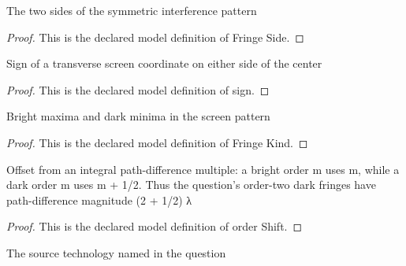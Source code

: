 \begin{definition}
  \label{def:physics:phyx-mini-0248:phyxminiproblems-problemphyxmini0248-fringeside}
  The two sides of the symmetric interference pattern
\end{definition}
\begin{proof}
  This is the declared model definition of Fringe Side.
\end{proof}
\begin{definition}[sign]
  \label{def:physics:phyx-mini-0248:phyxminiproblems-problemphyxmini0248-fringeside-sign}
  Sign of a transverse screen coordinate on either side of the center
\end{definition}
\begin{proof}
  This is the declared model definition of sign.
\end{proof}
\begin{definition}
  \label{def:physics:phyx-mini-0248:phyxminiproblems-problemphyxmini0248-fringekind}
  Bright maxima and dark minima in the screen pattern
\end{definition}
\begin{proof}
  This is the declared model definition of Fringe Kind.
\end{proof}
\begin{definition}
  \label{def:physics:phyx-mini-0248:phyxminiproblems-problemphyxmini0248-fringekind-ordershift}
  Offset from an integral path-difference multiple: a bright order m uses m, while a dark order m uses m + 1/2. Thus the question's order-two dark fringes have path-difference magnitude (2 + 1/2) λ
\end{definition}
\begin{proof}
  This is the declared model definition of order Shift.
\end{proof}
\begin{definition}
  \label{def:physics:phyx-mini-0248:phyxminiproblems-problemphyxmini0248-lightsourcekind}
  The source technology named in the question
\end{definition}
